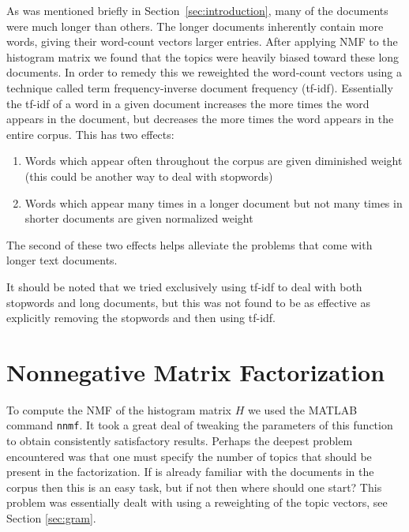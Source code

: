 \documentclass[fleqn,10pt]{../SelfArx} %
\begin{document}
As was mentioned briefly in Section~\ref{sec:introduction}, many of the documents were much longer than others. The longer documents inherently contain more words, giving their word-count vectors larger entries. After applying NMF to the histogram matrix we found that the topics were heavily biased toward these long documents. In order to remedy this we reweighted the word-count vectors using a technique called term frequency-inverse document frequency (tf-idf). Essentially the tf-idf of a word in a given document increases the more times the word appears in the document, but decreases the more times the word appears in the entire corpus. This has two effects:
\begin{enumerate}
	\item Words which appear often throughout the corpus are given diminished weight (this could be another way to deal with stopwords)
	\item Words which appear many times in a longer document but not many times in shorter documents are given normalized weight
\end{enumerate}

The second of these two effects helps alleviate the problems that come with longer text documents.

It should be noted that we tried exclusively using tf-idf to deal with both stopwords and long documents, but this was not found to be as effective as explicitly removing the stopwords and then using tf-idf.


   
\section{Nonnegative Matrix Factorization} %
\label{sec:nmf}
To compute the NMF of the histogram matrix $H$ we used the MATLAB command \texttt{nnmf}. It took a great deal of tweaking the parameters of this function to obtain consistently satisfactory results. Perhaps the deepest problem encountered was that one must specify the number of topics that should be present in the factorization. If is already familiar with the documents in the corpus then this is an easy task, but if not then where should one start? This problem was essentially dealt with using a reweighting of the topic vectors, see Section \ref{sec:gram}.
\end{document}

